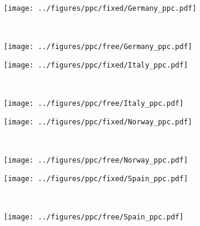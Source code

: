 \documentclass[12pt]{extarticle}
\begin{document}
\begin{figure}
    \ContinuedFloat 
    \begin{subfigure}{0.45\textwidth}
        \texttt{[image: ../figures/ppc/fixed/Germany\_ppc.pdf]}
    \end{subfigure}
    ~
    \begin{subfigure}{0.45\textwidth}
        \texttt{[image: ../figures/ppc/free/Germany\_ppc.pdf]}
    \end{subfigure}
    \begin{subfigure}{0.45\textwidth}
        \texttt{[image: ../figures/ppc/fixed/Italy\_ppc.pdf]}
    \end{subfigure}
    ~
    \begin{subfigure}{0.45\textwidth}
        \texttt{[image: ../figures/ppc/free/Italy\_ppc.pdf]}
    \end{subfigure}
    \begin{subfigure}{0.45\textwidth}
        \texttt{[image: ../figures/ppc/fixed/Norway\_ppc.pdf]}
    \end{subfigure}
    ~
    \begin{subfigure}{0.45\textwidth}
        \texttt{[image: ../figures/ppc/free/Norway\_ppc.pdf]}
    \end{subfigure}
    \begin{subfigure}{0.45\textwidth}
        \texttt{[image: ../figures/ppc/fixed/Spain\_ppc.pdf]}
    \end{subfigure}
    ~
    \begin{subfigure}{0.45\textwidth}
        \texttt{[image: ../figures/ppc/free/Spain\_ppc.pdf]}
    \end{subfigure}
\end{figure}
\end{document}
